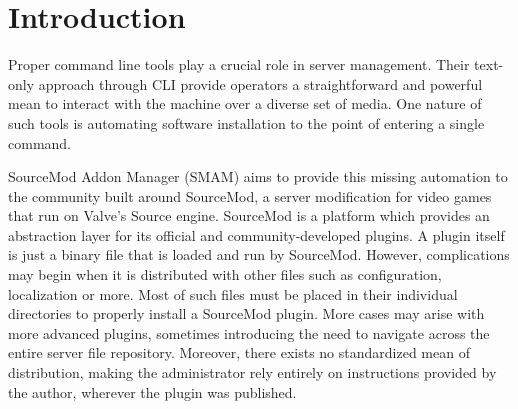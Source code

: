 \chapter{Introduction}

Proper command line tools play a crucial role in server management.
Their text-only approach through CLI provide operators a straightforward and powerful mean to interact with the machine over a diverse set of media.
One nature of such tools is automating software installation to the point of entering a single command.

SourceMod Addon Manager (SMAM) aims to provide this missing automation to the community built around SourceMod, a server modification for video games that run on Valve's Source engine.
SourceMod is a platform which provides an abstraction layer for its official and community-developed plugins.
A plugin itself is just a binary file that is loaded and run by SourceMod.
However, complications may begin when it is distributed with other files such as configuration, localization or more.
Most of such files must be placed in their individual directories to properly install a SourceMod plugin.
More cases may arise with more advanced plugins, sometimes introducing the need to navigate across the entire server file repository.
Moreover, there exists no standardized mean of distribution, making the administrator rely entirely on instructions provided by the author, wherever the plugin was published.

